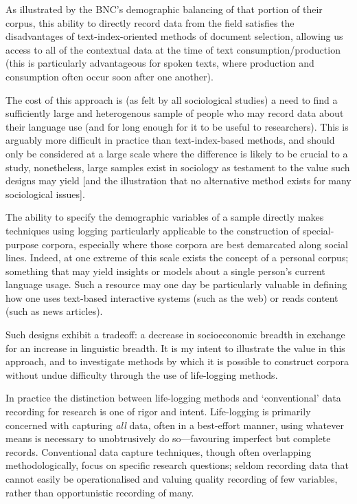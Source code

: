 As illustrated by the BNC's demographic balancing of that portion of their corpus, this ability to directly record data from the field satisfies the disadvantages of text-index-oriented methods of document selection, allowing us access to all of the contextual data at the time of text consumption/production (this is particularly advantageous for spoken texts, where production and consumption often occur soon after one another).

The cost of this approach is (as felt by all sociological studies) a need to find a sufficiently large and heterogenous sample of people who may record data about their language use (and for long enough for it to be useful to researchers).  This is arguably more difficult in practice than text-index-based methods, and should only be considered at a large scale where the difference is likely to be crucial to a study, nonetheless, large samples exist in sociology as testament to the value such designs may yield [and the illustration that no alternative method exists for many sociological issues].

The ability to specify the demographic variables of a sample directly makes techniques using logging particularly applicable to the construction of special-purpose corpora, especially where those corpora are best demarcated along social lines.  Indeed, at one extreme of this scale exists the concept of a personal corpus; something that may yield insights or models about a single person's current language usage.  Such a resource may one day be particularly valuable in defining how one uses text-based interactive systems (such as the web) or reads content (such as news articles).

Such designs exhibit a tradeoff: a decrease in socioeconomic breadth in exchange for an increase in linguistic breadth.  It is my intent to illustrate the value in this approach, and to investigate methods by which it is possible to construct corpora without undue difficulty through the use of life-logging methods.




In practice the distinction between life-logging methods and `conventional' data recording for research is one of rigor and intent.  Life-logging is primarily concerned with capturing \textsl{all} data, often in a best-effort manner, using whatever means is necessary to unobtrusively do so---favouring imperfect but complete records.  Conventional data capture techniques, though often overlapping methodologically, focus on specific research questions; seldom recording data that cannot easily be operationalised and valuing quality recording of few variables, rather than opportunistic recording of many.



